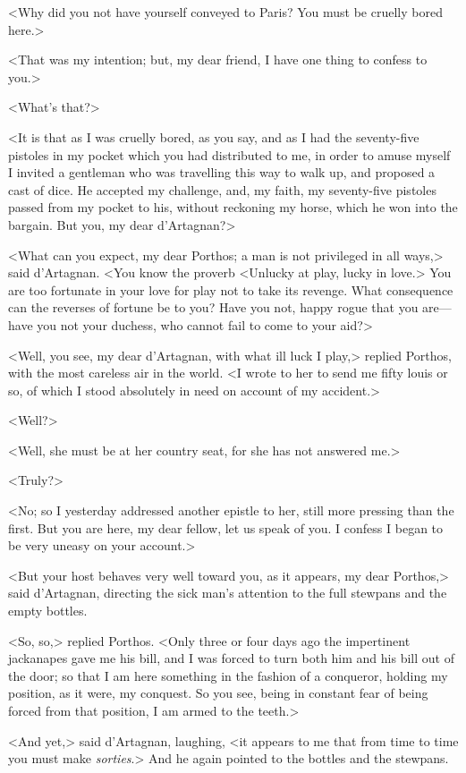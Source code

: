 <Why did you not have yourself conveyed to Paris? You must be cruelly bored here.> 

<That was my intention; but, my dear friend, I have one thing to confess to you.> 

<What's that?> 

<It is that as I was cruelly bored, as you say, and as I had the seventy-five pistoles in my pocket which you had distributed to me, in order to amuse myself I invited a gentleman who was travelling this way to walk up, and proposed a cast of dice. He accepted my challenge, and, my faith, my seventy-five pistoles passed from my pocket to his, without reckoning my horse, which he won into the bargain. But you, my dear d'Artagnan?> 

<What can you expect, my dear Porthos; a man is not privileged in all ways,> said d'Artagnan. <You know the proverb <Unlucky at play, lucky in love.> You are too fortunate in your love for play not to take its revenge. What consequence can the reverses of fortune be to you? Have you not, happy rogue that you are---have you not your duchess, who cannot fail to come to your aid?> 

<Well, you see, my dear d'Artagnan, with what ill luck I play,> replied Porthos, with the most careless air in the world. <I wrote to her to send me fifty louis or so, of which I stood absolutely in need on account of my accident.> 

<Well?> 

<Well, she must be at her country seat, for she has not answered me.> 

<Truly?> 

<No; so I yesterday addressed another epistle to her, still more pressing than the first. But you are here, my dear fellow, let us speak of you. I confess I began to be very uneasy on your account.> 

<But your host behaves very well toward you, as it appears, my dear Porthos,> said d'Artagnan, directing the sick man's attention to the full stewpans and the empty bottles. 

<So, so,> replied Porthos. <Only three or four days ago the impertinent jackanapes gave me his bill, and I was forced to turn both him and his bill out of the door; so that I am here something in the fashion of a conqueror, holding my position, as it were, my conquest. So you see, being in constant fear of being forced from that position, I am armed to the teeth.> 

<And yet,> said d'Artagnan, laughing, <it appears to me that from time to time you must make \textit{sorties}.> And he again pointed to the bottles and the stewpans. 

